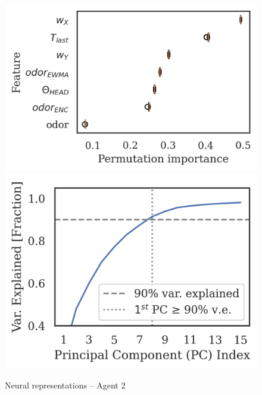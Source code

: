 \documentclass[5p,twocolumn,authoryear]{elsarticle}
\begin{document}
\begin{figure}[h!]
\begin{center}
\includegraphics[width=0.34\linewidth]{repr_3199993.png}
\includegraphics[width=0.30\linewidth]{scree_3199993.png}
\caption{Neural representations -- Agent 2}
\end{center}
\end{figure}
\end{document}
